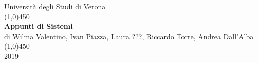 \documentclass[a4paper, 12pt, italian]{book}
\begin{document}
\begin{titlepage}

\begin{center}
\LARGE{Università degli Studi di Verona}\\
\line(1,0){450}\\
\vspace{10em}
\Huge{\textbf{Appunti di Sistemi}}\\
\vspace{14em}
\Large{di Wilma Valentino, Ivan Piazza, Laura ???, Riccardo Torre, Andrea Dall'Alba}\\
\line(1,0){450}\\
\LARGE{2019}\\
\end{center}

\end{titlepage}

\tableofcontents




\end{document}
